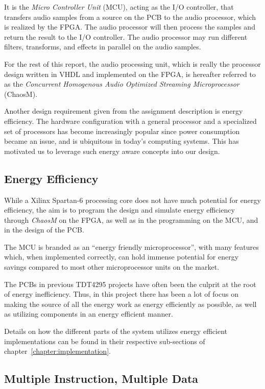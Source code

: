 It is the \textit{Micro Controller Unit} (MCU), acting as the I/O controller, that transfers audio samples from a
source on the PCB to the audio processor, which is realized by the FPGA. The
audio processor will then process the samples and return the result to the I/O
controller. The audio processor may run different filters, transforms, and
effects in parallel on the audio samples.

For the rest of this report, the audio processing unit, which is really the
processor design written in VHDL and implemented on the FPGA, is hereafter
referred to as the \textit{Concurrent Homogenous Audio Optimized Streaming
Microprocessor} (ChaosM).

Another design requirement given from the assignment description is energy
efficiency. The hardware configuration with a general processor and a
specialized set of processors has become increasingly popular since power
consumption became an issue, and is ubiquitous in today's computing systems.
This has motivated us to leverage such energy aware concepts into our design.

\subsection{Energy Efficiency}

While a Xilinx Spartan-6\cite{fpga-chip} processing core does not have much
potential for energy efficiency, the aim is to program the design and simulate
energy efficiency through \textit{ChaosM} on the FPGA, as well as in the
programming on the MCU, and in the design of the PCB.

The MCU is branded as an ``energy friendly microprocessor'', with many features
which, when implemented correctly, can hold immense potential for energy savings
compared to most other microprocessor units on the market.

The PCBs in previous TDT4295 projects have often been the culprit at the root of
energy inefficiency. Thus, in this project there has been a lot of focus on
making the source of all the energy work as energy efficiently as possible, as
well as utilizing components in an energy efficient manner.

Details on how the different parts of the system utilizes energy efficient
implementations can be found in their respective sub-sections of
chapter~\ref{chapter:implementation}.

\subsection{Multiple Instruction, Multiple Data}

